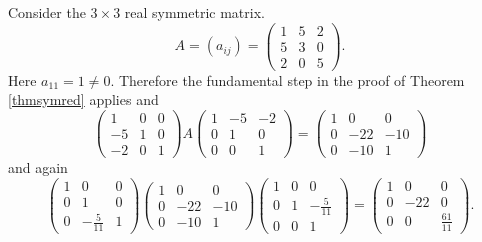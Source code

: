 \documentclass{article}
\begin{document}
\begin{example}\label{eksempel1}
  Consider the $3\times 3$ real symmetric matrix.
  \begin{equation*}
    A = (a_{ij}) = 
    \begin{pmatrix}
      1 & 5 & 2\\
      5 & 3 & 0\\
      2 & 0 & 5
    \end{pmatrix}
    .
  \end{equation*}
  Here $a_{11} = 1 \neq 0$. Therefore the fundamental step in the
  proof of Theorem \ref{thmsymred} applies and
  \begin{equation*}
    \begin{pmatrix}
      1 & 0 & 0 \\
      -5 & 1 & 0\\
      -2 & 0 & 1
    \end{pmatrix}
    A
    \begin{pmatrix}
      1 & -5 & -2\\
      0 & 1 & 0\\
      0 & 0 & 1
    \end{pmatrix}
    =
    \begin{pmatrix}
      1 & 0 & 0\\
      0 & -22 & -10\\
      0 & -10 & 1
    \end{pmatrix}
  \end{equation*}
  and again
  \begin{equation*}
    \begin{pmatrix}
      1 & 0 & 0 \\
      0 & 1 & 0\\
      0 & -\frac{5}{11} & 1
    \end{pmatrix}
    \begin{pmatrix}
      1 & 0 & 0\\
      0 & -22 & -10\\
      0 & -10 & 1
    \end{pmatrix}
    \begin{pmatrix}
      1 & 0 & 0\\
      0 & 1 & -\frac{5}{11}\\
      0 & 0 & 1
    \end{pmatrix}
    =
    \begin{pmatrix}
      1 & 0 & 0\\
      0 & -22 & 0\\
      0 & 0 & \frac{61}{11}
    \end{pmatrix}
    .
  \end{equation*}



\end{example}
\end{document}
